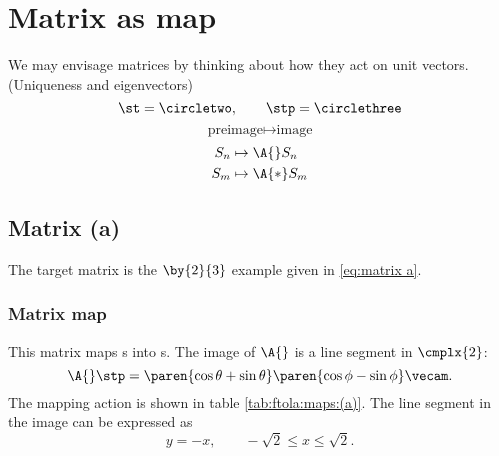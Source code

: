 \section{Matrix as map}
We may envisage matrices by thinking about how they act on unit vectors. (Uniqueness and eigenvectors) 
\begin{equation}
  \st = \circletwo, \qquad \stp = \circlethree
  \label{eq:ftola:sphere}
\end{equation}
%
\begin{equation}
  \text{preimage} \mapsto \text{image}
\end{equation}
%
\begin{equation}
  \begin{split}
    S_{n} &\mapsto \A{}  S_{n} \\
    S_{m} &\mapsto \A{*} S_{m}
  \end{split}
\end{equation}
%

\subsection{Matrix (a)}
The target matrix is the $\by{2}{3}$ example given in \eqref{eq:matrix a}.

\subsubsection{Matrix map} 
This matrix maps \vv s into \vvv s. The image of $\A{}$ is a line segment in $\cmplx{2}$:
\begin{equation}
  \A{} \stp = 
    \paren{ \cos \theta + \sin \theta }
    \paren{ \cos \phi   - \sin \phi } \vecam .
\end{equation}
The mapping action is shown in table \eqref{tab:ftola:maps:(a)}. The line segment in the image can be expressed as
\begin{equation}
  y = -x, \qquad -\sqrt{2} \le x \le \sqrt{2}.
\end{equation}

